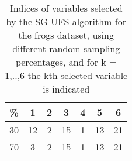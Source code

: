 \begin{table}
	\begin{center}
		\begin{tabular}{c c c c c c c}
			\% & 1 & 2 & 3 & 4 & 5 & 6 \\
			\hline
			30 & 12 & 2 & 15 & 1 & 13 & 21 \\
			70 & 3 & 2 & 15 & 1 & 13 & 21 \\
		\end{tabular}
	\end{center}
	\caption{Indices of variables selected by the SG-UFS algorithm for the frogs dataset, using different random sampling percentages, and for k = 1,..,6 the kth selected variable is indicated}
\end{table}